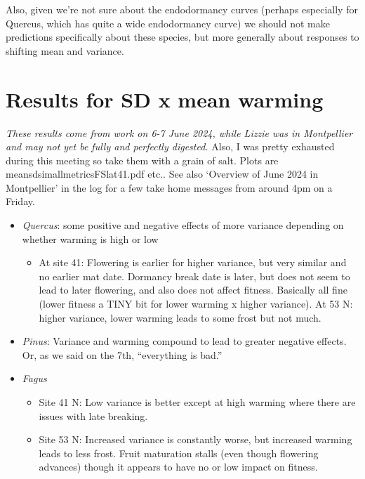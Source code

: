 \documentclass[11pt,letter]{article}
\begin{document}
Also, given we're not sure about the endodormancy curves (perhaps especially for Quercus, which has quite a wide endodormancy curve) we should not make predictions specifically about these species, but more generally about responses to shifting mean and variance. 

\section{Results for SD x mean warming}
\emph{These results come from work on 6-7 June 2024, while Lizzie was in Montpellier and may not yet be fully and perfectly digested.} Also, I was pretty exhausted during this meeting so take them with a grain of salt. Plots are meansdsimallmetricsFSlat41.pdf etc.. See also `Overview of June 2024 in Montpellier' in the log for a few take home messages from around 4pm on a Friday. 

\begin{itemize}
\item \emph{Quercus}: some positive and negative effects of more variance depending on whether warming is high or low
\begin{itemize}
\item At site 41: Flowering is earlier for higher variance, but very similar and no earlier mat date. Dormancy break date is later, but does not seem to lead to later flowering, and also does not affect fitness. Basically all fine (lower fitness a TINY bit for lower warming x higher variance).  At 53 N: higher variance, lower warming leads to some frost but not much.
\end{itemize}
\item \emph{Pinus}: Variance and warming compound to lead to greater negative effects. Or, as we said on the 7th, ``everything is bad.''
\item \emph{Fagus}
\begin{itemize}
\item Site 41 N: Low variance is better except at high warming where there are issues with late breaking.
\item Site 53 N: Increased variance is constantly worse, but increased warming leads to less frost. Fruit maturation stalls (even though flowering advances) though it appears to have no or low impact on fitness. 
\end{itemize}
\end{itemize}

\newpage
\end{document}
